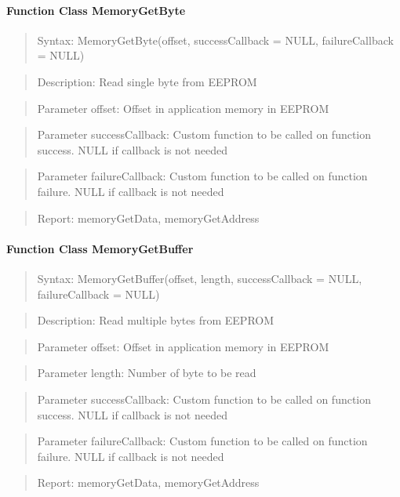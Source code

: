 \paragraph{Function Class MemoryGetByte}
\begin{quote}Syntax: MemoryGetByte(offset, successCallback = NULL, failureCallback = NULL)\end{quote}
\begin{quote}Description: Read single byte from EEPROM\end{quote}
\begin{quote}Parameter offset: Offset in application memory in EEPROM\end{quote}
\begin{quote}Parameter successCallback: Custom function to be called on function success. NULL if callback is not needed\end{quote}
\begin{quote}Parameter failureCallback: Custom function to be called on function failure. NULL if callback is not needed\end{quote}
\begin{quote}Report: memoryGetData, memoryGetAddress\end{quote}

\paragraph{Function Class MemoryGetBuffer}
\begin{quote}Syntax: MemoryGetBuffer(offset, length, successCallback = NULL, failureCallback = NULL)\end{quote}
\begin{quote}Description: Read multiple bytes from EEPROM\end{quote}
\begin{quote}Parameter offset: Offset in application memory in EEPROM\end{quote}
\begin{quote}Parameter length: Number of byte to be read\end{quote}
\begin{quote}Parameter successCallback: Custom function to be called on function success. NULL if callback is not needed\end{quote}
\begin{quote}Parameter failureCallback: Custom function to be called on function failure. NULL if callback is not needed\end{quote}
\begin{quote}Report: memoryGetData, memoryGetAddress\end{quote}

